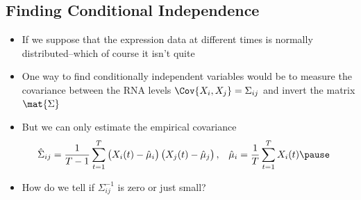 \begin{slide}
\section[-2]{Finding Conditional Independence}

\begin{PauseHighLight}
  \begin{itemize}
  \item If we suppose that the expression data at different times is
    normally distributed\pause--which of course it isn't\pauseb{}
    quite\pauseb
  \item One way to find conditionally independent variables would be to
    measure the covariance between the RNA levels $\Cov{X_i, X_j}=
    \Sigma_{ij}$ and invert the matrix $\mat{\Sigma}$\pause
  \item But we can only estimate the empirical covariance
    \begin{align*}
      \hat{\Sigma}_{ij} &=
      \frac{1}{T-1} \sum_{t=1}^T \left(\strut
                          X_i(t)-\hat{\mu}_i\right)
                          \left(\strut X_j(t)-\hat{\mu}_j\right), &
      \hat{\mu}_i &= \frac{1}{T}  \sum_{t=1}^T X_i(t)\pause
    \end{align*}
  \item How do we tell if $\Sigma^{-1}_{ij}$ is zero or just small?\pause
  \end{itemize}
\end{PauseHighLight}

\end{slide}


